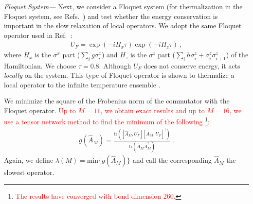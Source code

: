 \documentclass[twocolumn,superscriptaddress, prl,showpacs]{revtex4-1}
\newcommand{\addr}[1]{\textcolor{red}{#1}}
\begin{document}
{\it Floquet System---}
Next, we consider a Floquet system (for thermalization in the Floquet system, see Refs.~) and test whether the energy conservation is important in the slow relaxation of local operators.
We adopt the same Floquet operator used in Ref.~:
\begin{align}
U_F = \exp(-i H_x \tau) \exp(-i H_z \tau) ~,
\label{eq:floquet_op}
\end{align}
where $H_x$ is the $\sigma^x$ part ($\sum_i g \sigma^x_i$) and $H_z$ is the $\sigma^z$ part ($\sum_i h \sigma^z_i +\sigma^z_i \sigma^z_{i+1}$)
of the Hamiltonian. We choose $\tau = 0.8$.
Although $U_F$ does not conserve energy, it acts {\it locally} on the system.
This type of Floquet operator is shown to thermalize a local operator to the infinite temperature ensemble \cite{Kim_ETH,Prosen:2002}.

We minimize the square of the Frobenius norm of the commutator with the Floquet operator.
\addr{Up to $M = 11$, we obtain exact results and up to $M = 16$, we use a tensor network method to find the minimum of the following
\footnote{\addr{The results have converged with bond dimension 260.}}:}
\begin{align}\label{eq:floquet_minimize}
g(\hat{A}_M) = \frac{\mathrm{tr}([\hat{A}_M,U_F][\hat{A}_M,U_F]^\dag)}{\mathrm{tr}(\hat{A}_M\hat{A}_M^\dag)} ~.
\end{align}
Again, we define $\lambda(M) = \mathrm{min}\{g(\hat{A}_M)\}$ and
call the corresponding $\hat{A}_M$ the slowest operator.
\end{document}
